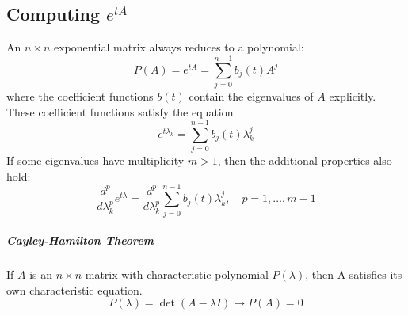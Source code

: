 \documentclass[11pt]{article}
\begin{document}
	\subsection{Computing $e^{tA}$}
		An $n\times n$ exponential matrix always reduces to a polynomial:
		\begin{equation}
			P(A) = e^{tA} = \sum_{j=0}^{n-1} b_j(t)A^j
		\end{equation}
		where the coefficient functions $b(t)$ contain the eigenvalues of $A$ explicitly. These coefficient functions satisfy the equation
		\begin{equation}
			e^{t\lambda_k} = \sum_{j=0}^{n-1} b_j(t)\lambda_k^j
		\end{equation}
		If some eigenvalues have multiplicity $m>1$, then the additional properties also hold:
		\begin{equation}
			\frac{d^p}{d\lambda_k^p}e^{t\lambda} = \frac{d^p}{d\lambda_k^p} \sum_{j=0}^{n-1} b_j(t)\lambda_k^j, \quad p = 1, \ldots, m-1
		\end{equation}
		
		\subparagraph{Cayley-Hamilton Theorem} If $A$ is an $n\times n$ matrix with characteristic polynomial $P(\lambda)$, then A satisfies its own characteristic equation.
		\begin{equation}
			P(\lambda) = \det(A - \lambda I) \rightarrow P(A) = 0
		\end{equation}

%		
%		


\end{document}
